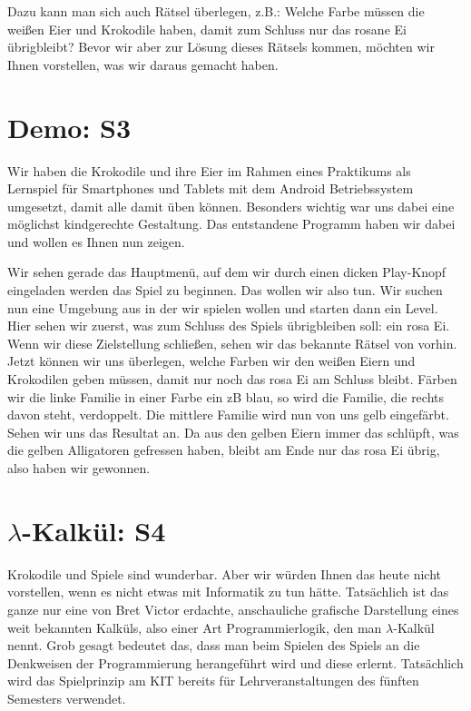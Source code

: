 \documentclass{scrartcl}
\begin{document}
	Dazu kann man sich auch Rätsel überlegen, z.B.:
	Welche Farbe müssen die weißen Eier und Krokodile haben, damit zum Schluss nur das rosane Ei übrigbleibt?
	Bevor wir aber zur Lösung dieses Rätsels kommen, möchten wir Ihnen vorstellen, was wir daraus gemacht haben.


	\section{Demo: S3}
	Wir haben die Krokodile und ihre Eier im Rahmen eines Praktikums als Lernspiel für Smartphones und Tablets mit dem Android Betriebssystem umgesetzt, damit alle damit üben können.
	Besonders wichtig war uns dabei eine möglichst kindgerechte Gestaltung.
	Das entstandene Programm haben wir dabei und wollen es Ihnen nun zeigen.

	Wir sehen gerade das Hauptmenü, auf dem wir durch einen dicken Play-Knopf eingeladen werden das Spiel zu beginnen.
	Das wollen wir also tun.
	Wir suchen nun eine Umgebung aus in der wir spielen wollen und starten dann ein Level.
	Hier sehen wir zuerst, was zum Schluss des Spiels übrigbleiben soll: ein rosa Ei.
	Wenn wir diese Zielstellung schließen, sehen wir das bekannte Rätsel von vorhin.
	Jetzt können wir uns überlegen, welche Farben wir den weißen Eiern und Krokodilen geben müssen, damit nur noch das rosa Ei am Schluss bleibt.
	Färben wir die linke Familie in einer Farbe ein zB blau, so wird die Familie, die rechts davon steht, verdoppelt.
	Die mittlere Familie wird nun von uns gelb eingefärbt.
	Sehen wir uns das Resultat an.
	Da aus den gelben Eiern immer das schlüpft, was die gelben Alligatoren gefressen haben, bleibt am Ende nur das rosa Ei übrig, also haben wir gewonnen. 
	
	
	

	\section{$\lambda$-Kalkül: S4}
	Krokodile und Spiele sind wunderbar.
	Aber wir würden Ihnen das heute nicht vorstellen, wenn es nicht etwas mit Informatik zu tun hätte.
	Tatsächlich ist das ganze nur eine von Bret Victor erdachte, anschauliche grafische Darstellung eines weit bekannten Kalküls, also einer Art Programmierlogik, den man $\lambda$-Kalkül nennt.
	Grob gesagt bedeutet das, dass man beim Spielen des Spiels an die Denkweisen der Programmierung herangeführt wird und diese erlernt.
	Tatsächlich wird das Spielprinzip am KIT bereits für Lehrveranstaltungen des fünften Semesters verwendet.
\end{document}
